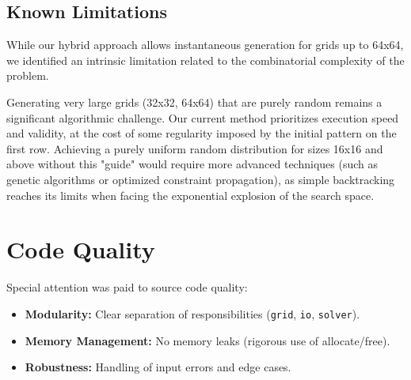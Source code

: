 \documentclass[a4paper,11pt]{article}
\begin{document}
\subsection{Known Limitations}
While our hybrid approach allows instantaneous generation for grids up to 64x64, we identified an intrinsic limitation related to the combinatorial complexity of the problem.

Generating very large grids (32x32, 64x64) that are purely random remains a significant algorithmic challenge. Our current method prioritizes execution speed and validity, at the cost of some regularity imposed by the initial pattern on the first row.
Achieving a purely uniform random distribution for sizes 16x16 and above without this "guide" would require more advanced techniques (such as genetic algorithms or optimized constraint propagation), as simple backtracking reaches its limits when facing the exponential explosion of the search space.

\section{Code Quality}
Special attention was paid to source code quality:
\begin{itemize}
    \item \textbf{Modularity:} Clear separation of responsibilities (\texttt{grid}, \texttt{io}, \texttt{solver}).
    \item \textbf{Memory Management:} No memory leaks (rigorous use of allocate/free).
    \item \textbf{Robustness:} Handling of input errors and edge cases.
\end{itemize}
\end{document}
